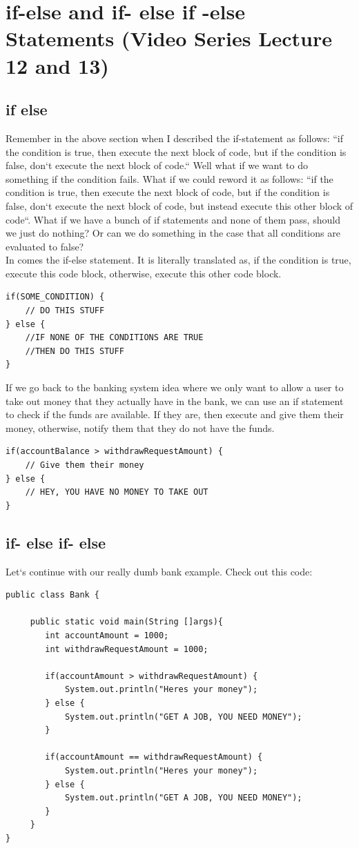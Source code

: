 \documentclass[11]{article}
\begin{document}
\section{if-else and if- else if -else Statements (Video Series Lecture 12 and 13)}
\subsection{if else}
Remember in the above section when I described the if-statement as follows: ``if the condition is true, then execute the next block of code, but if the condition is false, don`t execute the next block of code.`` Well what if we want to do something if the condition fails. What if we could reword it as follows: ``if the condition is true, then execute the next block of code, but if the condition is false, don`t execute the next block of code, but instead execute this other block of code``. What if we have a bunch of if statements and none of them pass, should we just do nothing? Or can we do something in the case that all conditions are evaluated to false?\\

In comes the if-else statement. It is literally translated as, if the condition is true, execute this code block, otherwise, execute this other code block.

\begin{lstlisting}
if(SOME_CONDITION) {
    // DO THIS STUFF
} else {
    //IF NONE OF THE CONDITIONS ARE TRUE
    //THEN DO THIS STUFF
}
\end{lstlisting}

If we go back to the banking system idea where we only want to allow a user to take out money that they actually have in the bank, we can use an if statement to check if the funds are available. If they are, then execute and give them their money, otherwise, notify them that they do not have the funds.
\begin{lstlisting}
if(accountBalance > withdrawRequestAmount) {
    // Give them their money
} else {
	// HEY, YOU HAVE NO MONEY TO TAKE OUT
}
\end{lstlisting}

\subsection{if- else if- else}
Let`s continue with our really dumb bank example. Check out this code:

\begin{lstlisting}
public class Bank {

     public static void main(String []args){
        int accountAmount = 1000;
        int withdrawRequestAmount = 1000;
        
        if(accountAmount > withdrawRequestAmount) {
            System.out.println("Heres your money");
        } else {
            System.out.println("GET A JOB, YOU NEED MONEY");
        }
        
        if(accountAmount == withdrawRequestAmount) {
            System.out.println("Heres your money");
        } else {
            System.out.println("GET A JOB, YOU NEED MONEY");
        }
     }
}
\end{lstlisting}
\end{document}
